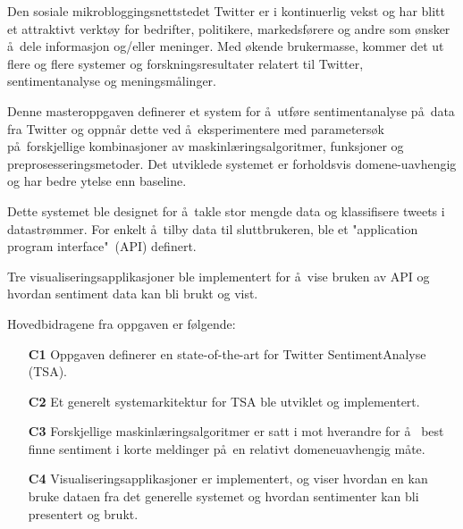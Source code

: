 Den sosiale mikrobloggingsnettstedet Twitter er i kontinuerlig vekst og har blitt et attraktivt verkt\o y for bedrifter, politikere, markedsf\o rere og andre som \o nsker \aa~dele informasjon og/eller meninger. Med \o kende brukermasse, kommer det ut flere og flere systemer og forskningsresultater relatert til Twitter, sentimentanalyse og meningsm\aa linger.

Denne masteroppgaven definerer et system for \aa~utf\o re sentimentanalyse p\aa~data fra Twitter og oppn\aa r dette ved \aa~eksperimentere med parameters\o k p\aa~forskjellige kombinasjoner av maskinl\ae ringsalgoritmer, funksjoner og preprosesseringsmetoder. Det utviklede systemet er forholdsvis domene-uavhengig og har bedre ytelse enn baseline.

Dette systemet ble designet for \aa~takle stor mengde data og klassifisere tweets i datastr\o mmer. For enkelt \aa~tilby data til sluttbrukeren, ble et "application program interface"~(API) definert.

Tre visualiseringsapplikasjoner ble implementert for \aa~vise bruken av API og hvordan sentiment data kan bli brukt og vist.

Hovedbidragene fra oppgaven er f\o lgende:

\begin{itemize}
\item[\textbf{C1}] Oppgaven definerer en state-of-the-art for Twitter SentimentAnalyse (TSA).

\item[\textbf{C2}] Et generelt systemarkitektur for TSA ble utviklet og implementert.

\item[\textbf{C3}] Forskjellige maskinl\ae ringsalgoritmer er satt i mot hverandre for \aa~ best finne sentiment i korte meldinger p\aa~en relativt domeneuavhengig m\aa te.

\item[\textbf{C4}] Visualiseringsapplikasjoner er implementert, og viser hvordan en kan bruke dataen fra det generelle systemet og hvordan sentimenter kan bli presentert og brukt.
\end{itemize}

\clearpage
